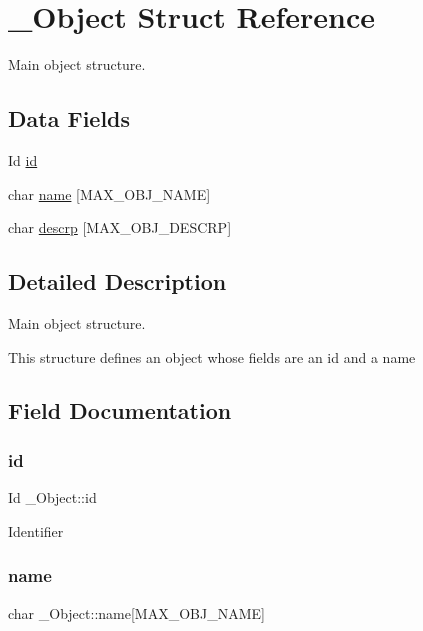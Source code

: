 \hypertarget{struct__Object}{}\section{\+\_\+\+Object Struct Reference}
\label{struct__Object}


Main object structure.  


\subsection*{Data Fields}
\begin{DoxyCompactItemize}
\item 
Id \hyperlink{struct__Object_a3cff7a0e8dc4e9d23895ed9af1b7653a}{id}
\item 
char \hyperlink{struct__Object_a59556463a256cec309077768589f10a8}{name} \mbox{[}M\+A\+X\+\_\+\+O\+B\+J\+\_\+\+N\+A\+ME\mbox{]}
\item 
char \hyperlink{struct__Object_affa493ad8fdeafe924950f7388356a55}{descrp} \mbox{[}M\+A\+X\+\_\+\+O\+B\+J\+\_\+\+D\+E\+S\+C\+RP\mbox{]}
\end{DoxyCompactItemize}


\subsection{Detailed Description}
Main object structure. 

This structure defines an object whose fields are an id and a name 

\subsection{Field Documentation}
\mbox{\label{struct__Object_a3cff7a0e8dc4e9d23895ed9af1b7653a}} 
\subsubsection{\texorpdfstring{id}{id}}
{\footnotesize\ttfamily Id \+\_\+\+Object\+::id}

Identifier \mbox{\label{struct__Object_a59556463a256cec309077768589f10a8}} 
\subsubsection{\texorpdfstring{name}{name}}
{\footnotesize\ttfamily char \+\_\+\+Object\+::name\mbox{[}M\+A\+X\+\_\+\+O\+B\+J\+\_\+\+N\+A\+ME\mbox{]}}

